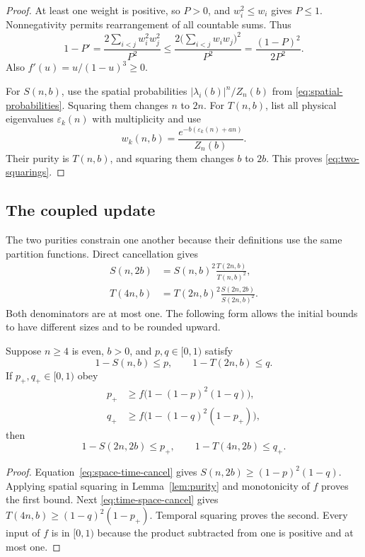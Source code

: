 \begin{proof}
At least one weight is positive, so $P>0$, and $w_i^2\le w_i$ gives
$P\le1$. Nonnegativity permits rearrangement of all countable sums.
Thus
\[
 1-P'
 =\frac{2\sum_{i<j}w_i^2w_j^2}{P^2}
 \le\frac{2\bigl(\sum_{i<j}w_iw_j\bigr)^2}{P^2}
 =\frac{(1-P)^2}{2P^2}.
\]
Also $f'(u)=u/(1-u)^3\ge0$.

For $S(n,b)$, use the spatial probabilities
$|\lambda_i(b)|^n/Z_n(b)$ from \eqref{eq:spatial-probabilities}.
Squaring them changes $n$ to $2n$. For $T(n,b)$, list all physical
eigenvalues $\varepsilon_k(n)$ with multiplicity and use
\begin{equation}\label{eq:gibbs-weights}
 w_k(n,b)=\frac{e^{-b(\varepsilon_k(n)+an)}}{Z_n(b)}.
\end{equation}
Their purity is $T(n,b)$, and squaring them changes $b$ to $2b$.
This proves \eqref{eq:two-squarings}.
\end{proof}

\subsection{The coupled update}

The two purities constrain one another because their definitions use
the same partition functions.  Direct cancellation gives
\begin{align}
 S(n,2b)&=S(n,b)^2\frac{T(2n,b)}{T(n,b)^2},
   \label{eq:space-time-cancel}\\
 T(4n,b)&=T(2n,b)^2\frac{S(2n,2b)}{S(2n,b)^2}.
   \label{eq:time-space-cancel}
\end{align}
Both denominators are at most one.  The following form allows the
initial bounds to have different sizes and to be rounded upward.

\begin{lemma}\label{lem:rounded-update}
Suppose $n\ge4$ is even, $b>0$, and $p,q\in[0,1)$ satisfy
\[
 1-S(n,b)\le p,\qquad 1-T(2n,b)\le q.
\]
If $p_+,q_+\in[0,1)$ obey
\begin{equation}\label{eq:rounded-update}
 \begin{split}
 p_+&\ge f\bigl(1-(1-p)^2(1-q)\bigr),\\
 q_+&\ge f\bigl(1-(1-q)^2(1-p_+)\bigr),
 \end{split}
\end{equation}
then
\[
 1-S(2n,2b)\le p_+,\qquad
 1-T(4n,2b)\le q_+.
\]
\end{lemma}

\begin{proof}
Equation~\eqref{eq:space-time-cancel} gives
$S(n,2b)\ge(1-p)^2(1-q)$. Applying spatial squaring in
Lemma~\ref{lem:purity} and monotonicity of $f$ proves the first bound.
Next \eqref{eq:time-space-cancel} gives
$T(4n,b)\ge(1-q)^2(1-p_+)$. Temporal squaring proves the second.
Every input of $f$ is in $[0,1)$ because the product subtracted from
one is positive and at most one.
\end{proof}

